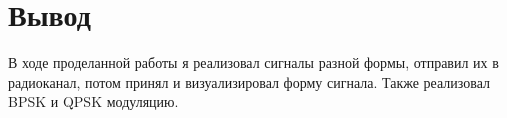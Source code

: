 \chapter{Вывод}
\label{ch:chap3}

В ходе проделанной работы я реализовал сигналы разной формы, отправил их в радиоканал, потом принял и визуализировал форму сигнала.
Также реализовал BPSK и QPSK модуляцию.

\endinput